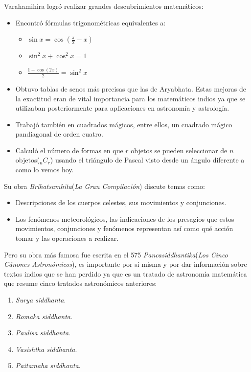 \documentclass[a4paper, 11pt]{article}
\begin{document}
		Varahamihira logró realizar grandes descubrimientos matemáticos:
		\begin{itemize}
			\item Encontró fórmulas trigonométricas equivalentes a:
					\begin{itemize}
						\item $\displaystyle \sin x = \cos( \frac{\pi}{2} - x)$
						\item $\displaystyle \sin^2 x + \cos^2 x = 1$
						\item $\displaystyle \frac{1 - \cos(2x)}{2} = \sin^2 x$
					\end{itemize}
			\item Obtuvo tablas de senos más precisas que las de Aryabhata. Estas mejoras de la exactitud eran de vital
			importancia para los matemáticos indios ya que se utilizaban posteriormente para aplicaciones en astronomía
			y astrología.
			\item Trabajó también en cuadrados mágicos, entre ellos, un cuadrado mágico pandiagonal de orden cuatro.
			\item Calculó el número de formas en que $r$ objetos se pueden seleccionar de $n$ objetos($_n C_r$) usando
			el triángulo de Pascal visto desde un ángulo diferente a como lo vemos hoy.
		\end{itemize}

		Su obra \textit{Brihatsamhita}(\textit{La Gran Compilación}) discute temas como:
		\begin{itemize}
			\item Descripciones de los cuerpos celestes, sus movimientos y conjunciones.
			\item Los fenómenos meteorológicos, las indicaciones de los presagios que estos movimientos, conjunciones
			y fenómenos representan así como qué acción tomar y las operaciones a realizar.
		\end{itemize}
		
		Pero su obra más famosa fue escrita en el 575 \textit{Pancasiddhantika}(\textit{Los Cinco Cánones Astronómicos}), 
		es importante por sí misma y por dar información sobre textos indios que se han perdido ya que es un tratado
		de astronomía matemática que resume cinco tratados astronómicos anteriores:
		\begin{enumerate}
			\item \textit{Surya siddhanta}.
			\item \textit{Romaka siddhanta}.
			\item \textit{Paulisa siddhanta}.
			\item \textit{Vasishtha siddhanta}.
			\item \textit{Paitamaha siddhanta}.
		\end{enumerate}
\end{document}
